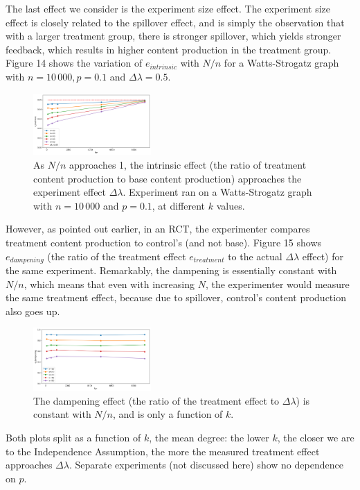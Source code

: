 \documentclass[final,5p,times,twocolumn,authoryear]{elsarticle}
\begin{document}
The last effect we consider is the experiment size effect. The experiment size effect is closely related to the spillover effect, and is simply the observation that with a larger treatment group, there is stronger spillover, which yields stronger feedback, which results in higher content production in the treatment group. Figure 14 shows the variation of $e_{intrinsic}$ with $N/n$ for a Watts-Strogatz graph with $n=10\,000, p=0.1$ and $\Delta \lambda = 0.5$.

\begin{figure}[h]
	\centering 
	\includegraphics[width=0.4\textwidth]{figure-14.png}	
	\caption{As $N/n$ approaches 1, the intrinsic effect (the ratio of treatment content production to base content production) approaches the experiment effect $\Delta \lambda$. Experiment ran on a Watts-Strogatz graph with $n=10\,000$ and $p=0.1$, at different $k$ values.} 
\end{figure}

However, as pointed out earlier, in an RCT, the experimenter compares treatment content production to control's (and not base). Figure 15 shows $e_{dampening}$ (the ratio of the treatment effect $e_{treatment}$ to the actual $\Delta \lambda$ effect) for the same experiment. Remarkably, the dampening is essentially constant with $N/n$, which means that even with increasing $N$, the experimenter would measure the same treatment effect, because due to spillover, control's content production also goes up.

\begin{figure}[h]
	\centering 
	\includegraphics[width=0.4\textwidth]{figure-15.png}	
	\caption{The dampening effect (the ratio of the treatment effect to $\Delta \lambda$) is constant with $N/n$, and is only a function of $k$.} 
\end{figure}

Both plots split as a function of $k$, the mean degree: the lower $k$, the closer we are to the Independence Assumption, the more the measured treatment effect approaches $\Delta \lambda$. Separate experiments (not discussed here) show no dependence on $p$.
\end{document}
